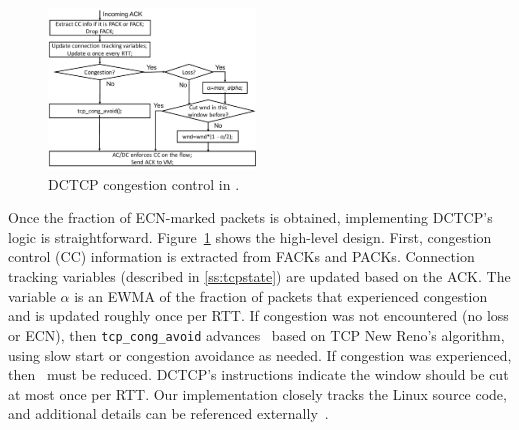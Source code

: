 \begin{figure}[!t]
        \centering
  \includegraphics[width=0.49\textwidth]{figures/acdc_cc.pdf}
        \caption{DCTCP congestion control in \acdc{}.}
        \label{acdc_cc}
\end{figure}
Once the fraction of ECN-marked packets is obtained, implementing DCTCP's logic is straightforward.
Figure~\ref{acdc_cc} shows the high-level design. 
First, congestion control (CC) information is extracted from FACKs and PACKs. Connection tracking
variables (described in \cref{ss:tcpstate}) are updated based on the ACK. The variable
$\alpha$ is an EWMA of the fraction of packets that experienced congestion and is updated roughly
once per RTT. If congestion was not encountered (no loss or ECN), then {\tt tcp\_cong\_avoid} advances~\cwnd{}
based on TCP New Reno's algorithm, using slow start or congestion avoidance as needed. If congestion was
experienced, then~\cwnd{} must be reduced. DCTCP's instructions indicate the window should
be cut at most once per RTT.
Our implementation closely tracks the Linux source code, and
additional details can be referenced externally~\cite{alizadeh2011data,ietf-tcpm-dctcp}.


